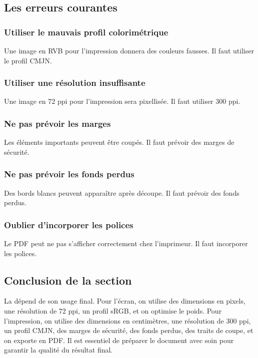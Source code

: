 \subsection{Les erreurs courantes}

\subsubsection{Utiliser le mauvais profil colorimétrique}

Une image en RVB pour l'impression donnera des couleurs fausses. Il faut utiliser le profil CMJN.

\subsubsection{Utiliser une résolution insuffisante}

Une image en 72 ppi pour l'impression sera pixellisée. Il faut utiliser 300 ppi.

\subsubsection{Ne pas prévoir les marges}

Les éléments importants peuvent être coupés. Il faut prévoir des marges de sécurité.

\subsubsection{Ne pas prévoir les fonds perdus}

Des bords blancs peuvent apparaître après découpe. Il faut prévoir des fonds perdus.

\subsubsection{Oublier d'incorporer les polices}

Le PDF peut ne pas s'afficher correctement chez l'imprimeur. Il faut incorporer les polices.

\subsection*{Conclusion de la section}

La  dépend de son usage final. Pour l'écran, on utilise des dimensions en pixels, une résolution de 72 ppi, un profil sRGB, et on optimise le poids. Pour l'impression, on utilise des dimensions en centimètres, une résolution de 300 ppi, un profil CMJN, des marges de sécurité, des fonds perdus, des traits de coupe, et on exporte en PDF. Il est essentiel de préparer le document avec soin pour garantir la qualité du résultat final.

